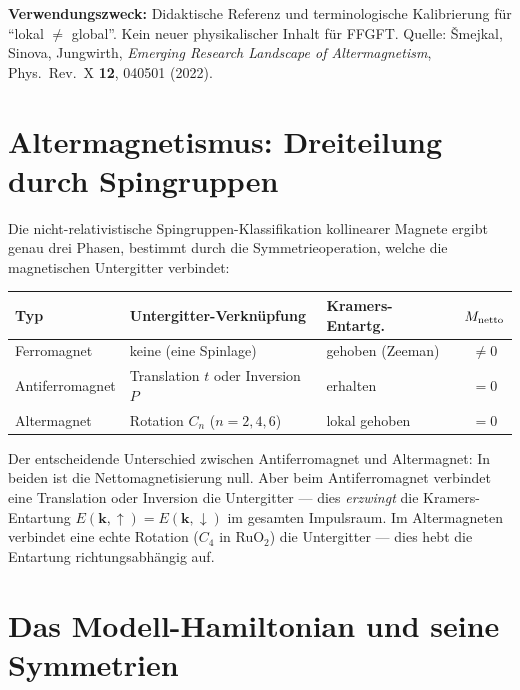 \textbf{Verwendungszweck:} Didaktische Referenz und terminologische
Kalibrierung für \enquote{lokal $\neq$ global}. Kein neuer physikalischer
Inhalt für FFGFT.
Quelle: Šmejkal, Sinova, Jungwirth,
\textit{Emerging Research Landscape of Altermagnetism},
Phys.\ Rev.\ X \textbf{12}, 040501 (2022).

\section{Altermagnetismus: Dreiteilung durch Spingruppen \E}

Die nicht-relativistische Spingruppen-Klassifikation kollinearer Magnete
ergibt genau drei Phasen, bestimmt durch die Symmetrieoperation, welche
die magnetischen Untergitter verbindet:

\begin{center}
\begin{tabular}{lllc}
\toprule
\textbf{Typ} & \textbf{Untergitter-Verknüpfung} & \textbf{Kramers-Entartg.} & $M_{\rm netto}$\\
\midrule
Ferromagnet     & keine (eine Spinlage)              & gehoben (Zeeman)  & $\neq 0$\\
Antiferromagnet & Translation $t$ oder Inversion $P$ & erhalten          & $= 0$\\
Altermagnet     & Rotation $C_n$ ($n=2,4,6$)         & lokal gehoben     & $= 0$\\
\bottomrule
\end{tabular}
\end{center}

Der entscheidende Unterschied zwischen Antiferromagnet und Altermagnet:
In beiden ist die Nettomagnetisierung null. Aber beim Antiferromagnet
verbindet eine Translation oder Inversion die Untergitter — dies
\emph{erzwingt} die Kramers-Entartung $E(\mathbf{k},\uparrow) =
E(\mathbf{k},\downarrow)$ im gesamten Impulsraum.
Im Altermagneten verbindet eine echte Rotation ($C_4$ in RuO$_2$)
die Untergitter — dies hebt die Entartung richtungsabhängig auf.

\section{Das Modell-Hamiltonian und seine Symmetrien \E}

